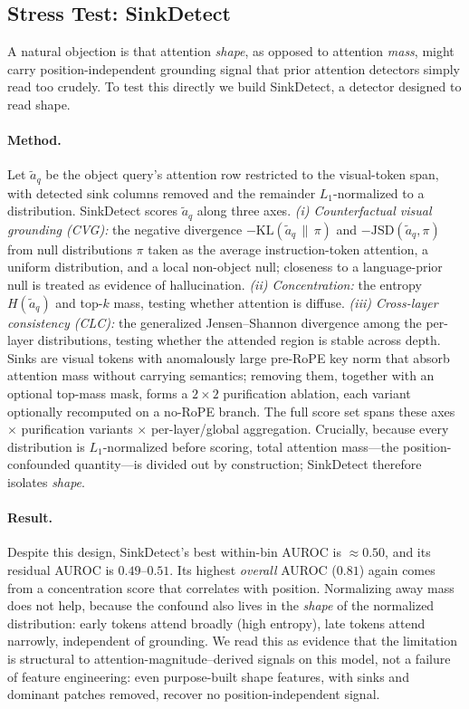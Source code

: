 


\subsection{Stress Test: SinkDetect}
\label{sec:sinkdetect}

A natural objection is that attention \emph{shape}, as opposed to attention \emph{mass}, might carry position-independent grounding signal that prior attention detectors simply read too crudely. To test this directly we build SinkDetect, a detector designed to read shape.

\paragraph{Method.} Let $\tilde a_q$ be the object query's attention row restricted to the visual-token span, with detected sink columns removed and the remainder $L_1$-normalized to a distribution. SinkDetect scores $\tilde a_q$ along three axes. \emph{(i) Counterfactual visual grounding (CVG):} the negative divergence $-\mathrm{KL}(\tilde a_q \,\|\, \pi)$ and $-\mathrm{JSD}(\tilde a_q, \pi)$ from null distributions $\pi$ taken as the average instruction-token attention, a uniform distribution, and a local non-object null; closeness to a language-prior null is treated as evidence of hallucination. \emph{(ii) Concentration:} the entropy $H(\tilde a_q)$ and top-$k$ mass, testing whether attention is diffuse. \emph{(iii) Cross-layer consistency (CLC):} the generalized Jensen--Shannon divergence among the per-layer distributions, testing whether the attended region is stable across depth. Sinks are visual tokens with anomalously large pre-RoPE key norm that absorb attention mass without carrying semantics; removing them, together with an optional top-mass mask, forms a $2\times2$ purification ablation, each variant optionally recomputed on a no-RoPE branch. The full score set spans these axes $\times$ purification variants $\times$ per-layer/global aggregation. Crucially, because every distribution is $L_1$-normalized before scoring, total attention mass---the position-confounded quantity---is divided out by construction; SinkDetect therefore isolates \emph{shape}.

\paragraph{Result.} Despite this design, SinkDetect's best within-bin AUROC is $\approx$$0.50$, and its residual AUROC is $0.49$--$0.51$. Its highest \emph{overall} AUROC ($0.81$) again comes from a concentration score that correlates with position. Normalizing away mass does not help, because the confound also lives in the \emph{shape} of the normalized distribution: early tokens attend broadly (high entropy), late tokens attend narrowly, independent of grounding. We read this as evidence that the limitation is structural to attention-magnitude--derived signals on this model, not a failure of feature engineering: even purpose-built shape features, with sinks and dominant patches removed, recover no position-independent signal.

